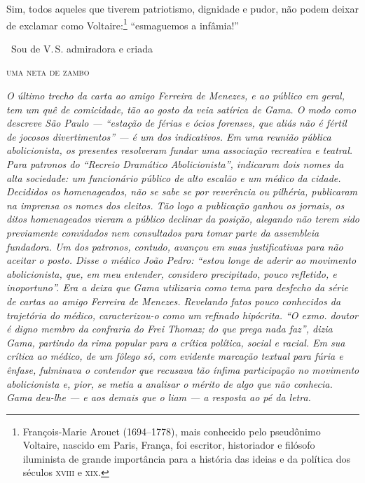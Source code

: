 Sim, todos aqueles que tiverem patriotismo, dignidade e pudor, não podem
deixar de exclamar como Voltaire:\footnote{François-Marie Arouet
  (1694--1778), mais conhecido pelo pseudônimo Voltaire, nascido em
  Paris, França, foi escritor, historiador e filósofo iluminista de
  grande importância para a história das ideias e da política dos
  séculos \textsc{xviii} e \textsc{xix}.}
``esmaguemos a infâmia!''\medskip

\hfill\ Sou de V.\,S. admiradora e criada

\hfill\textsc{uma neta de zambo}


\begin{resumo}
\emph{O último trecho da carta ao amigo Ferreira de Menezes, e ao
público em geral, tem um quê de comicidade, tão ao gosto da veia
satírica de Gama. O modo como descreve São Paulo --- ``estação de férias e
ócios forenses, que aliás não é fértil de jocosos divertimentos'' --- é um
dos indicativos. Em uma reunião pública abolicionista, os presentes
resolveram fundar uma associação recreativa e teatral. Para patronos do
``Recreio Dramático Abolicionista'', indicaram dois nomes da alta
sociedade: um funcionário público de alto escalão e um médico da cidade.
Decididos os homenageados, não se sabe se por reverência ou pilhéria,
publicaram na imprensa os nomes dos eleitos. Tão logo a publicação
ganhou os jornais, os ditos homenageados vieram a público declinar da
posição, alegando não terem sido previamente convidados nem
consultados para tomar parte da assembleia fundadora. Um dos patronos,
contudo, avançou em suas justificativas para não aceitar o posto. Disse
o médico João Pedro: ``estou longe de aderir ao movimento abolicionista,
que, em meu entender, considero precipitado, pouco refletido, e
inoportuno''. Era a deixa que Gama utilizaria como tema para desfecho da
série de cartas ao amigo Ferreira de Menezes. Revelando fatos pouco
conhecidos da trajetória do médico, caracterizou-o como um refinado hipócrita. ``O exmo.
doutor é digno membro da confraria do Frei Thomaz; do que prega nada
faz'', dizia Gama, partindo da rima popular para a crítica política,
social e racial. Em sua crítica ao médico, de um fôlego só, com evidente
marcação textual para fúria e ênfase, fulminava o contendor que recusava tão ínfima
participação no movimento abolicionista e, pior, se metia a analisar o
mérito de algo que não conhecia. Gama deu-lhe --- e aos demais que o liam
--- a resposta ao pé da letra.}
\end{resumo}\pagebreak

